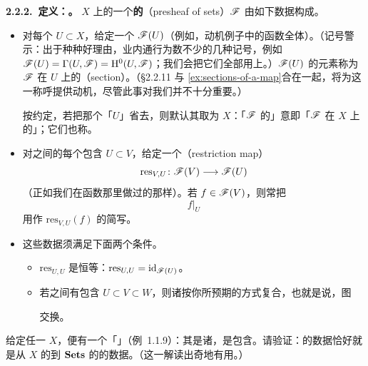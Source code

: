 \textbf{2.2.2.\ 定义：\trPresheaf。}\quad \trTopologicalSpace{} $X$ 上的一个\textbf{\trSetsWord{}的\trPresheaf}（presheaf of sets）$\mathscr{F}$ 由如下数据构成。
\begin{itemize}
\item 对每个\trOpenSubset{} $U\subset X$，给定一个\trSet{} $\mathscr{F}(U)$（例如，动机例子中的\trDifferentiable{}函数全体）。（记号警示：出于种种好理由，业内通行为数不少的几种记号，例如 $\mathscr{F}(U)=\Gamma(U,\mathscr{F})=\mathrm{H}^0(U,\mathscr{F})$；我们会把它们全部用上。）$\mathscr{F}(U)$ 的元素称为 $\mathscr{F}$ 在 $U$ 上的\textbf{\trSection}（section）。（\S2.2.11 与 \cref{ex:sections-of-a-map}合在一起，将为这一称呼提供动机，尽管此事对我们并不十分重要。）

按约定，若把那个「$U$」省去，则默认其取为 $X$：「$\mathscr{F}$ 的\trSection」意即「$\mathscr{F}$ 在 $X$ 上的\trSection」；它们也称\textbf{\trGlobalSections}。

\item 对\trOpenSet{}之间的每个包含 $U\subset V$，给定一个\textbf{\trRestrictionMap}（restriction map）
\[
\mathrm{res}_{V,U}\colon\mathscr{F}(V)\longrightarrow\mathscr{F}(U)
\]
（正如我们在\trDifferentiable{}函数那里做过的那样）。若 $f\in\mathscr{F}(V)$，则常把
\[
f|_{U}
\]
用作 $\mathrm{res}_{V,U}(f)$ 的简写。

\item 这些数据须满足下面两个条件。
\begin{itemize}
\item \trMap{} $\mathrm{res}_{U,U}$ 是恒等：$\mathrm{res}_{U,U}=\mathrm{id}_{\mathscr{F}(U)}$。
\item 若\trOpenSet{}之间有包含 $U\subset V\subset W$，则诸\trRestrictionMap{}按你所预期的方式复合，也就是说，图
交换。
\end{itemize}
\end{itemize}

\begin{exercise}\label{ex:presheaf-contravariant-functor}
给定任一\trTopologicalSpace{} $X$，便有一个「\trOpenSet\trCategory」（\mbox{例~1.1.9}）：其\trObject{}是诸\trOpenSet，\trMorphism{}是包含。请验证：\trPresheaf{}的数据恰好就是从 $X$ 的\trOpenSet\trCategory{}到 $\mathbf{Sets}$ 的\trContravariantFunctor{}的数据。（这一解读出奇地有用。）
\end{exercise}

